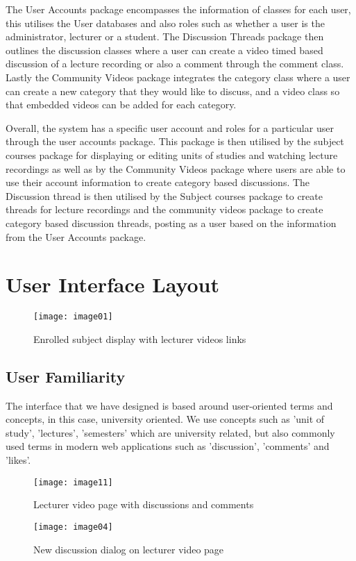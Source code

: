 \documentclass{article}
\begin{document}
The User Accounts package encompasses the information of classes for each user, this utilises the User databases and also roles such as whether a user is the administrator, lecturer or a student. The Discussion Threads package then outlines the discussion classes where a user can create a video timed based discussion of a lecture recording or also a comment through the comment class. Lastly the Community Videos package integrates the category class where a user can create a new category that they would like to discuss, and a video class so that embedded videos can be added for each category.

Overall, the system has a specific user account and roles for a particular user through the user accounts package. This package is then utilised by the subject courses package for displaying or editing units of studies and watching lecture recordings as well as by the Community Videos package where users are able to use their account information to create category based discussions.  The Discussion thread is then utilised by the Subject courses package to create threads for lecture recordings and the community videos package to create category based discussion threads, posting as a user based on the information from the User Accounts package.

\section{User Interface Layout}
\begin{figure}[h!]
\centering
\texttt{[image: image01]}
\caption{Enrolled subject display with lecturer videos links}
\end{figure}

\subsection{User Familiarity}
The interface that we have designed is based around user-oriented terms and concepts, in this case, university oriented. We use concepts such as 'unit of study', 'lectures', 'semesters' which are university related, but also commonly used terms in modern web applications such as 'discussion', 'comments' and 'likes'.

\begin{figure}[h!]
\centering
\texttt{[image: image11]}
\caption{Lecturer video page with discussions and comments}
\end{figure}

\begin{figure}[h!]
\centering
\texttt{[image: image04]}
\caption{New discussion dialog on lecturer video page}
\end{figure}
\end{document}
